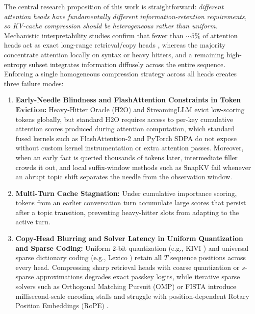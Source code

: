 \documentclass[conference]{IEEEtran}
\begin{document}
The central research proposition of this work is straightforward: \emph{different attention heads have fundamentally different information-retention requirements, so KV-cache compression should be heterogeneous rather than uniform.} Mechanistic interpretability studies confirm that fewer than $\sim 5\%$ of attention heads act as exact long-range retrieval/copy heads \cite{b14}, whereas the majority concentrate attention locally on syntax or heavy hitters, and a remaining high-entropy subset integrates information diffusely across the entire sequence. Enforcing a single homogeneous compression strategy across all heads creates three failure modes:
\begin{enumerate}
    \item \textbf{Early-Needle Blindness and FlashAttention Constraints in Token Eviction:} Heavy-Hitter Oracle (H2O) \cite{b2} and StreamingLLM \cite{b3} evict low-scoring tokens globally, but standard H2O requires access to per-key cumulative attention scores produced during attention computation, which standard fused kernels such as FlashAttention-2 \cite{b4} and PyTorch SDPA do not expose without custom kernel instrumentation or extra attention passes. Moreover, when an early fact is queried thousands of tokens later, intermediate filler crowds it out, and local suffix-window methods such as SnapKV \cite{b5} fail whenever an abrupt topic shift separates the needle from the observation window.
    \item \textbf{Multi-Turn Cache Stagnation:} Under cumulative importance scoring, tokens from an earlier conversation turn accumulate large scores that persist after a topic transition, preventing heavy-hitter slots from adapting to the active turn.
    \item \textbf{Copy-Head Blurring and Solver Latency in Uniform Quantization and Sparse Coding:} Uniform $2$-bit quantization (e.g., KIVI \cite{b6}) and universal sparse dictionary coding (e.g., Lexico \cite{b7}) retain all $T$ sequence positions across every head. Compressing sharp retrieval heads with coarse quantization or $s$-sparse approximations degrades exact passkey logits, while iterative sparse solvers such as Orthogonal Matching Pursuit (OMP) or FISTA \cite{b8} introduce millisecond-scale encoding stalls and struggle with position-dependent Rotary Position Embeddings (RoPE) \cite{b9}.
\end{enumerate}
\end{document}
